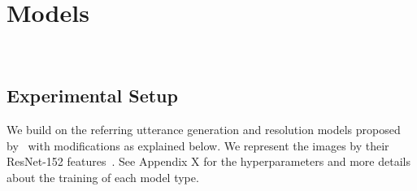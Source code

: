 
\section{Models}
\label{sec:models}

\\
\subsection{Experimental Setup}
\label{sec:exps}
We build on the referring utterance generation and resolution models proposed by~\citet{takmaz-etal-2020-refer} with modifications as explained below. %
We represent the images by their ResNet-152 features~\cite{resnet2016}. %
See Appendix X for the hyperparameters and more details about the training of each model type.

 



